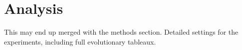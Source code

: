 \section{Analysis}
This may end up merged with the methods section. Detailed settings for the 
experiments, including full evolutionary tableaux.
